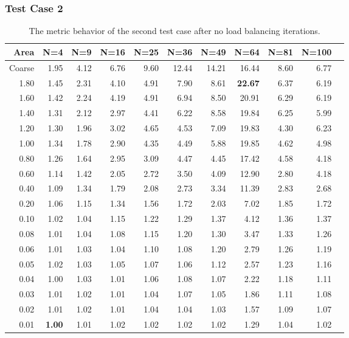\documentclass[]{beamer}
\begin{document}
\begin{frame}[t]\frametitle{Test Case 2}
\begin{table}[H]
\tiny
\centering
\caption{The metric behavior of the second test case after no load balancing iterations.} 
\begin{tabular}{rrrrrrrrrrr}
  \hline
 Area & N=4 & N=9 & N=16 & N=25 & N=36 & N=49 & N=64 & N=81 & N=100 \\ 
  \hline
 Coarse & 1.95 & 4.12 & 6.76 & 9.60 & 12.44 & 14.21 & 16.44 & 8.60 & 6.77 \\ 
1.80 & 1.45 & 2.31 & 4.10 & 4.91 & 7.90 & 8.61 & \textbf{\cellcolor{blue!25}22.67} & 6.37 & 6.19 \\ 
 1.60 & 1.42 & 2.24 & 4.19 & 4.91 & 6.94 & 8.50 & 20.91 & 6.29 & 6.19 \\ 
 1.40 & 1.31 & 2.12 & 2.97 & 4.41 & 6.22 & 8.58 & 19.84 & 6.25 & 5.99 \\ 
 1.20 & 1.30 & 1.96 & 3.02 & 4.65 & 4.53 & 7.09 & 19.83 & 4.30 & 6.23 \\ 
 1.00 & 1.34 & 1.78 & 2.90 & 4.35 & 4.49 & 5.88 & 19.85 & 4.62 & 4.98 \\ 
 0.80 & 1.26 & 1.64 & 2.95 & 3.09 & 4.47 & 4.45 & 17.42 & 4.58 & 4.18 \\ 
  0.60 & 1.14 & 1.42 & 2.05 & 2.72 & 3.50 & 4.09 & 12.90 & 2.80 & 4.18 \\ 
 0.40 & 1.09 & 1.34 & 1.79 & 2.08 & 2.73 & 3.34 & 11.39 & 2.83 & 2.68 \\ 
 0.20 & 1.06 & 1.15 & 1.34 & 1.56 & 1.72 & 2.03 & 7.02 & 1.85 & 1.72 \\ 
  0.10 & 1.02 & 1.04 & 1.15 & 1.22 & 1.29 & 1.37 & 4.12 & 1.36 & 1.37 \\ 
   0.08 & 1.01 & 1.04 & 1.08 & 1.15 & 1.20 & 1.30 & 3.47 & 1.33 & 1.26 \\ 
  0.06 & 1.01 & 1.03 & 1.04 & 1.10 & 1.08 & 1.20 & 2.79 & 1.26 & 1.19 \\ 
 0.05 & 1.02 & 1.03 & 1.05 & 1.07 & 1.06 & 1.12 & 2.57 & 1.23 & 1.16 \\ 
 0.04 & 1.00 & 1.03 & 1.01 & 1.06 & 1.08 & 1.07 & 2.22 & 1.18 & 1.11 \\ 
 0.03 & 1.01 & 1.02 & 1.01 & 1.04 & 1.07 & 1.05 & 1.86 & 1.11 & 1.08 \\ 
  0.02 & 1.01 & 1.02 & 1.01 & 1.04 & 1.04 & 1.03 & 1.57 & 1.09 & 1.07 \\ 
 0.01 & \textbf{\cellcolor{blue!25}1.00} & 1.01 & 1.02 & 1.02 & 1.02 & 1.02 & 1.29 & 1.04 & 1.02 \\ 
   \hline
\end{tabular}
\end{table}
\end{frame}
\end{document}
